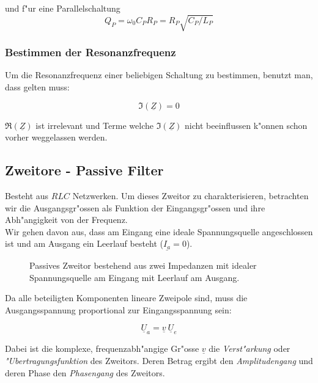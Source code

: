 \documentclass[german, 10pt, a4paper, headsepline]{scrreprt}
\theoremstyle{remark}
\begin{document}
und f"ur eine Parallelschaltung
\begin{displaymath}
	Q_P = \omega_0 C_P R_P = R_P \sqrt{C_P / L_P}
\end{displaymath}

\subsubsection{Bestimmen der Resonanzfrequenz}

Um die Resonanzfrequenz einer beliebigen Schaltung zu bestimmen, benutzt man, dass gelten muss:

\begin{displaymath}
	\Im(\underline{Z}) = 0
\end{displaymath}

$\Re(\underline{Z})$ ist irrelevant und Terme welche $\Im(\underline{Z})$ nicht beeinflussen k"onnen schon vorher weggelassen werden.


\subsection{Zweitore - Passive Filter}

Besteht aus $RLC$ Netzwerken. Um dieses Zweitor zu charakterisieren, betrachten wir die Ausgangsgr"ossen als Funktion der Eingangsgr"ossen und ihre Abh"angigkeit von der Frequenz.\\

Wir gehen davon aus, dass am Eingang eine ideale Spannungsquelle angeschlossen ist und am Ausgang ein Leerlauf besteht ($\underline{I_a}=0$).

\begin{figure}[hbt]
 
 \centerline{\box\graph}
 \caption{Passives Zweitor bestehend aus zwei Impedanzen mit idealer Spannungsquelle am Eingang mit Leerlauf am Ausgang.}
 \label{zweitor}
\end{figure}

Da alle beteiligten Komponenten lineare Zweipole sind, muss die Ausgangsspannung proportional zur Eingangsspannung sein:

\begin{displaymath}
	\underline{U}_a = \underline{v}\:\underline{U}_e
\end{displaymath}

Dabei ist die komplexe, frequenzabh"angige Gr"osse $\underline{v}$ die \textit{Verst"arkung} oder \textit{"Ubertragungsfunktion} des Zweitors. Deren Betrag ergibt den \textit{Amplitudengang} und deren Phase den \textit{Phasengang} des Zweitors.\\
\end{document}
